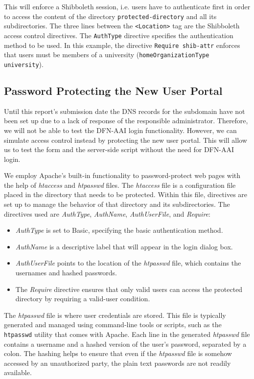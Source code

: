 This will enforce a Shibboleth session, i.e. users have to authenticate first in
order to access the content of the directory \texttt{protected-directory} and
all its subdirectories. The three lines between the \texttt{<Location>} tag are
the Shibboleth access control directives. The \texttt{AuthType} directive
specifies the authentication method to be used. In this example, the directive
\texttt{Require shib-attr} enforces that users must be members of a university
(\texttt{homeOrganizationType university}).

\subsection{Password Protecting the New User Portal}

Until this report's submission date the DNS records for the subdomain have not
been set up due to a lack of response of the responsible administrator.
Therefore, we will not be able to test the DFN-AAI login functionality. However,
we can simulate access control instead by protecting the new user portal. This
will allow us to test the form and the server-side script without the need for
DFN-AAI login.

We employ Apache's built-in functionality to password-protect web pages with the
help of \textit{htaccess} and \textit{htpasswd} files. The \textit{htaccess}
file is a configuration file placed in the directory that needs to be protected.
Within this file, directives are set up to manage the behavior of that directory
and its subdirectories. The directives used are \textit{AuthType},
\textit{AuthName}, \textit{AuthUserFile}, and \textit{Require}: 

\begin{itemize}
	\item \textit{AuthType} is set to Basic, specifying the basic authentication
    method. 
    \item \textit{AuthName} is a descriptive label that will appear in the
    login dialog box.
    \item \textit{AuthUserFile} points to the location of the \textit{htpasswd}
    file, which contains the usernames and hashed passwords. 
    \item The \textit{Require} directive ensures that only valid users can
    access the protected directory by requiring a valid-user condition.
\end{itemize}

The \textit{htpasswd} file is where user credentials are stored. This file is
typically generated and managed using command-line tools or scripts, such as the
\texttt{htpasswd} utility that comes with Apache. Each line in the generated
\textit{htpasswd} file contains a username and a hashed version of the user's
password, separated by a colon. The hashing helps to ensure that even if the
\textit{htpasswd} file is somehow accessed by an unauthorized party, the plain
text passwords are not readily available.

